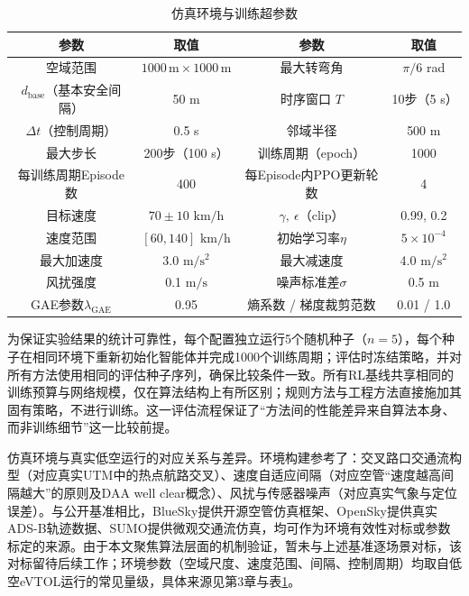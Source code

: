 \documentclass[12pt,a4paper,UTF8]{ctexart}
\begin{document}
\begin{table}[H]
    \centering\small
    \caption{仿真环境与训练超参数}
    \label{tab:env}
    \begin{tabular}{|c|c|c|c|}
        \hline
        \textbf{参数} & \textbf{取值} & \textbf{参数} & \textbf{取值} \\
        \hline
        空域范围 & $1000\,\mathrm{m}\times1000\,\mathrm{m}$ & 最大转弯角 & $\pi/6$ rad \\
        $d_{\text{base}}$（基本安全间隔） & 50 m & 时序窗口 $T$ & 10步（5 s） \\
        $\Delta t$（控制周期） & 0.5 s & 邻域半径 & 500 m \\
        最大步长 & 200步（100 s） & 训练周期（epoch） & 1000 \\
        每训练周期Episode数 & 400 & 每Episode内PPO更新轮数 & 4 \\
        目标速度 & $70\pm10$ $\mathrm{km/h}$ & $\gamma,\ \epsilon$（clip） & 0.99, 0.2 \\
        速度范围 & $[60, 140]$ $\mathrm{km/h}$ & 初始学习率$\eta$ & $5\times10^{-4}$ \\
        最大加速度 & 3.0 $\mathrm{m/s^2}$ & 最大减速度 & 4.0 $\mathrm{m/s^2}$ \\
        风扰强度 & 0.1 $\mathrm{m/s}$ & 噪声标准差$\sigma$ & 0.5 m \\
        GAE参数$\lambda_{\text{GAE}}$ & 0.95 & 熵系数 / 梯度裁剪范数 & 0.01 / 1.0 \\
        \hline
    \end{tabular}
\end{table}

为保证实验结果的统计可靠性，每个配置独立运行5个随机种子（$n=5$），每个种子在相同环境下重新初始化智能体并完成1000个训练周期；评估时冻结策略，并对所有方法使用相同的评估种子序列，确保比较条件一致。所有RL基线共享相同的训练预算与网络规模，仅在算法结构上有所区别；规则方法与工程方法直接施加其固有策略，不进行训练。这一评估流程保证了“方法间的性能差异来自算法本身、而非训练细节”这一比较前提。

仿真环境与真实低空运行的对应关系与差异。环境构建参考了：交叉路口交通流构型（对应真实UTM中的热点航路交叉）、速度自适应间隔（对应空管“速度越高间隔越大”的原则及DAA well clear概念）、风扰与传感器噪声（对应真实气象与定位误差）。与公开基准相比，BlueSky\cite{ref52}提供开源空管仿真框架、OpenSky\cite{ref53}提供真实ADS-B轨迹数据、SUMO\cite{ref54}提供微观交通流仿真，均可作为环境有效性对标或参数标定的来源。由于本文聚焦算法层面的机制验证，暂未与上述基准逐场景对标，该对标留待后续工作；环境参数（空域尺度、速度范围、间隔、控制周期）均取自低空eVTOL运行的常见量级，具体来源见第3章与表\ref{tab:env}。
\end{document}
